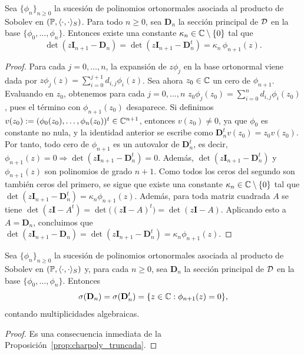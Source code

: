 \begin{prop}\label{prop:charpoly_truncada}
	Sea $\{\phi_n\}_{n\ge0}$ la sucesión de polinomios ortonormales asociada al producto de Sobolev en $(\mathbb{P}, \langle \cdot,\cdot\rangle_S)$. Para todo \(n\ge0\), sea
	\(\mathbf D_n\) la sección principal de \(\mathcal{D}\) en la base \(\{\phi_0,\dots,\phi_n\}\).
	Entonces existe una constante \(\kappa_n\in\mathbb{C}\setminus\{0\}\) tal que
	\[
		\det(z\mathbf I_{n+1}-\mathbf D_n)
		=
		\det(z\mathbf I_{n+1}-\mathbf D_n^t)
		=
		\kappa_n\,\phi_{n+1}(z).
	\]
\end{prop}

\begin{proof}
	Para cada $j=0,\dots,n$, la expansión de $z\phi_j$ en la base ortonormal viene dada por \(z\phi_j(z)=\sum_{i=0}^{j+1} d_{i,j}\phi_i(z)\).
	Sea ahora $z_0\in\mathbb{C}$ un cero de $\phi_{n+1}$. Evaluando en $z_0$, obtenemos para cada
	$j=0,\dots,n$
	\(z_0\phi_j(z_0)=\sum_{i=0}^{n} d_{i,j}\phi_i(z_0)\),
	pues el término con $\phi_{n+1}(z_0)$ desaparece. Si definimos
	\(v(z_0):=(\phi_0(z_0),\dots,\phi_n(z_0))^t\in\mathbb{C}^{n+1}\),
	entonces $v(z_0)\neq 0$, ya que $\phi_0$ es constante no nula, y la identidad anterior se escribe como
	\(\mathbf D_n^t v(z_0)=z_0 v(z_0)\).
	Por tanto, todo cero de $\phi_{n+1}$ es un autovalor de $\mathbf D_n^t$, es decir,
	\(\phi_{n+1}(z)=0 \Longrightarrow \det(z\mathbf I_{n+1}-\mathbf D_n^t)=0\).
	Además, $\det(z\mathbf I_{n+1}-\mathbf D_n^t)$ y $\phi_{n+1}(z)$ son polinomios de
	grado $n+1$. Como todos los ceros del segundo son también ceros del primero, se sigue que existe una constante
	$\kappa_n\in\mathbb{C}\setminus\{0\}$ tal que \(\det(z\mathbf I_{n+1}-\mathbf D_n^t)=\kappa_n\phi_{n+1}(z)\).
	Además, para toda matriz cuadrada $A$ se tiene
	\(\det(z\mathbf I-A^t)=\det\bigl((z\mathbf I-A)^t\bigr)=\det(z\mathbf I-A)\).
	Aplicando esto a $A=\mathbf D_n$, concluimos que
	\(\det(z\mathbf I_{n+1}-\mathbf D_n)=\det(z\mathbf I_{n+1}-\mathbf D_n^t)=\kappa_n\phi_{n+1}(z)\).
\end{proof}

\begin{cor}
	Sea $\{\phi_n\}_{n\ge0}$ la sucesión de polinomios ortonormales asociada al producto de Sobolev en $(\mathbb{P},\langle \cdot,\cdot\rangle_S)$ y, para cada $n\ge0$, sea $\mathbf D_n$ la sección principal de $\mathcal{D}$ en la base $\{\phi_0,\dots,\phi_n\}$. Entonces
	\[
		\sigma(\mathbf D_n)
		=
		\sigma(\mathbf D_n^t)
		=
		\{z\in\mathbb{C}:\phi_{n+1}(z)=0\},
	\]
	contando multiplicidades algebraicas.
\end{cor}

\begin{proof}
	Es una consecuencia inmediata de la Proposición~\ref{prop:charpoly_truncada}.
\end{proof}

